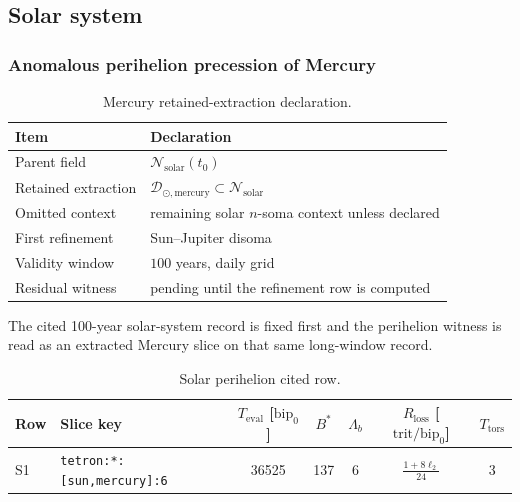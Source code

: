 \subsection{Solar system}

\subsubsection{Anomalous perihelion precession of Mercury}
\label{man:solar-perihelion-witness}

\begin{table}[H]
\centering
\caption{Mercury retained-extraction declaration.}
\label{tab:mercury-retention}
\begin{threeparttable}
\begin{tabularx}{\linewidth}{@{}lX@{}}
\toprule
Item & Declaration \\
\midrule
Parent field & \(\mathcal N_{\mathrm{solar}}(t_0)\) \\
Retained extraction & \(\mathcal D_{\odot,\mathrm{mercury}}\subset\mathcal N_{\mathrm{solar}}\) \\
Omitted context & remaining solar \(n\)-soma context unless declared \\
First refinement & Sun--Jupiter disoma \\
Validity window & \(100\) years, daily grid \\
Residual witness & pending until the refinement row is computed \\
\bottomrule
\end{tabularx}
\end{threeparttable}
\end{table}

The cited 100-year solar-system record is fixed first and the perihelion witness is read as an extracted Mercury slice on that same long-window record.

\begin{table}[H]
\centering
\caption{Solar perihelion cited row.}
\label{tab:solar-perihelion-row}
\begin{threeparttable}
\small
\begin{tabularx}{\linewidth}{@{}lXccccc@{}}
\toprule
Row & Slice key & $T_{\mathrm{eval}}$ [\(\mathrm{bip}_0\)] & $B^*$ & $\Lambda_b$ & $R_{\mathrm{loss}}$ [\(\mathrm{trit}/\mathrm{bip}_0\)] & $T_{\mathrm{tors}}$ \\
\midrule
S1 & \texttt{tetron:*:[sun,mercury]:6} & 36525 & 137 & 6 & $\frac{1+8\ell_2}{24}$ & 3 \\
\bottomrule
\end{tabularx}
\end{threeparttable}
\end{table}

